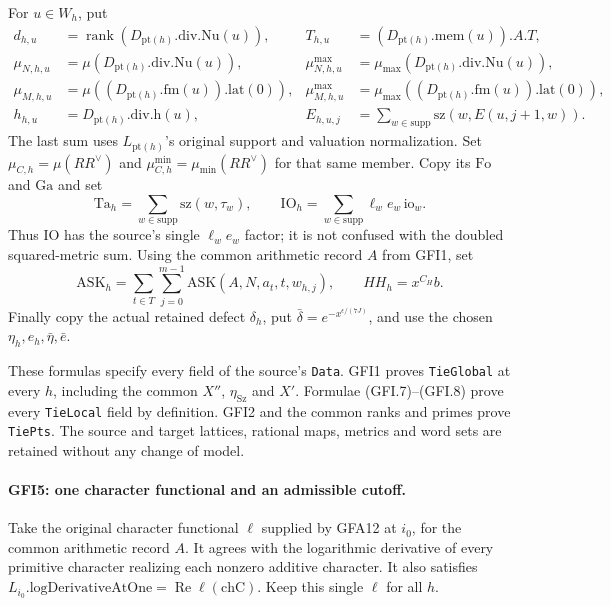 For $u\in W_h$, put
\[
\begin{aligned}
 d_{h,u}&=\operatorname{rank}(D_{\mathrm{pt}(h)}.\mathrm{div.Nu}(u)),&
 T_{h,u}&=(D_{\mathrm{pt}(h)}.\mathrm{mem}(u)).A.T,\\
 \mu_{N,h,u}&=\mu(D_{\mathrm{pt}(h)}.\mathrm{div.Nu}(u)),&
 \mu^{\max}_{N,h,u}&=\mu_{\max}(D_{\mathrm{pt}(h)}.\mathrm{div.Nu}(u)),\\
 \mu_{M,h,u}&=\mu((D_{\mathrm{pt}(h)}.\mathrm{fm}(u)).\mathrm{lat}(0)),&
 \mu^{\max}_{M,h,u}&=\mu_{\max}((D_{\mathrm{pt}(h)}.\mathrm{fm}(u)).\mathrm{lat}(0)),\\
 h_{h,u}&=D_{\mathrm{pt}(h)}.\mathrm{div.h}(u),&
 E_{h,u,j}&=\sum_{w\in\mathrm{supp}}\mathrm{sz}(w,E(u,j+1,w)).
\end{aligned}                                                     \tag{GFI.7}
\]
The last sum uses $L_{\mathrm{pt}(h)}$'s original support and
valuation normalization.  Set $\mu_{C,h}=\mu(RR^\vee)$ and
$\mu^{\min}_{C,h}=\mu_{\min}(RR^\vee)$ for that same member.
Copy its $\mathrm{Fo}$ and $\mathrm{Ga}$ and set
\[
 \mathrm{Ta}_h=\sum_{w\in\mathrm{supp}}\mathrm{sz}(w,\tau_w),
 \qquad
 \mathrm{IO}_h=\sum_{w\in\mathrm{supp}}\ell_we_w\,\mathrm{io}_w.
                                                               \tag{GFI.8}
\]
Thus $\mathrm{IO}$ has the source's single $\ell_we_w$ factor;
it is not confused with the doubled squared-metric sum.
Using the common arithmetic record $A$ from GFI1, set
\[
 \mathrm{ASK}_h=\sum_{t\in T}\sum_{j=0}^{m-1}
       \mathrm{ASK}(A,N,a_t,t,w_{h,j}),\qquad HH_h=x^{C_H}b.
                                                               \tag{GFI.9}
\]
Finally copy the actual retained defect $\delta_h$, put
$\bar\delta=e^{-x^{\epsilon/(7J)}}$, and use the chosen
$\eta_h,e_h,\bar\eta,\bar e$.

These formulas specify every field of the source's \texttt{Data}.
GFI1 proves \texttt{TieGlobal} at every $h$, including the common
$X''$, $\eta_{\mathrm{Sz}}$ and $X'$.  Formulae (GFI.7)--(GFI.8)
prove every \texttt{TieLocal} field by definition.  GFI2 and the
common ranks and primes prove \texttt{TiePts}.  The source and target
lattices, rational maps, metrics and word sets are retained without
any change of model.

\paragraph{GFI5: one character functional and an admissible cutoff.}
\label{claim:GFI5}
Take the original character functional $\ell$ supplied by GFA12
at $i_0$, for the common arithmetic record $A$.  It agrees with the
logarithmic derivative of every primitive character realizing each
nonzero additive character.  It also satisfies
$L_{i_0}.\mathrm{logDerivativeAtOne}=\operatorname{Re}\ell(\mathrm{chC})$.
Keep this single $\ell$ for all $h$.

